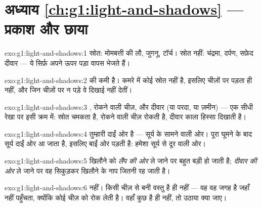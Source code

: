 \section*{अध्याय \ref{ch:g1:light-and-shadows} --- प्रकाश और छाया}

\begin{solution}{exo:g1:light-and-shadows:1}
स्रोत: मोमबत्ती की लौ, जुगनू, टॉर्च। स्रोत नहीं: चंद्रमा, दर्पण,
सफ़ेद दीवार --- ये सिर्फ़ अपने ऊपर पड़ा  वापस भेजते हैं।
\end{solution}

\begin{solution}{exo:g1:light-and-shadows:2}
 की कमी है। कमरे में कोई स्रोत नहीं है, इसलिए चीज़ों पर 
पड़ता ही नहीं, और जिन चीज़ों पर  न पड़े वे दिखाई नहीं देतीं।
\end{solution}

\begin{solution}{exo:g1:light-and-shadows:3}
, रोकने वाली चीज़, और दीवार (या परदा, या ज़मीन) --- एक
सीधी रेखा पर इसी क्रम में: स्रोत चमकता है, रोकने वाली चीज़ रोकती है,
दीवार काला हिस्सा दिखाती है।
\end{solution}

\begin{solution}{exo:g1:light-and-shadows:4}
 तुम्हारी दाईं ओर है --- सूर्य के सामने वाली ओर। पूरा घूमने के
बाद सूर्य दाईं ओर आ जाता है, इसलिए  बाईं ओर पड़ती है: हमेशा सूर्य
से दूर वाली ओर।
\end{solution}

\begin{solution}{exo:g1:light-and-shadows:5}
खिलौने को \emph{लैंप की ओर} ले जाने पर  बहुत बड़ी हो जाती है;
\emph{दीवार की ओर} ले जाने पर वह सिकुड़कर खिलौने के नाप जितनी रह जाती
है।
\end{solution}

\begin{solution}{exo:g1:light-and-shadows:6}
नहीं।  किसी चीज़ से बनी वस्तु है ही नहीं --- वह वह जगह है जहाँ
 नहीं पहुँचता, क्योंकि कोई चीज़  को रोक लेती है। वहाँ कुछ
है ही नहीं, तो उठाया क्या जाए।
\end{solution}

